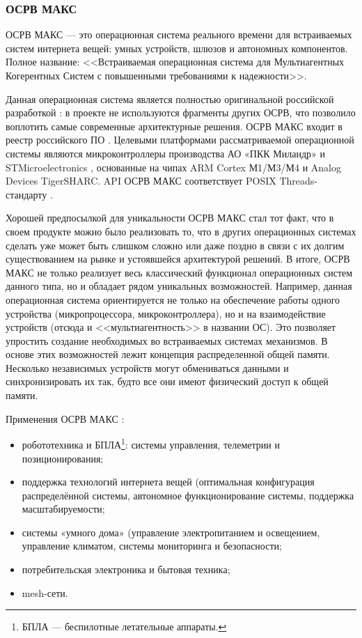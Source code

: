 


\subsubsection{ОСРВ МАКС}

ОСРВ МАКС \cite{MACS_overview} --- это операционная система реального времени для встраиваемых систем интернета вещей: умных устройств, шлюзов и автономных компонентов. Полное название: <<Встраиваемая операционная система для Мультиагентных Когерентных Систем с повышенными требованиями к надежности>>.

Данная операционная система является полностью оригинальной российской разработкой \cite{MACS_Astrosoft}: в проекте не используются фрагменты других ОСРВ, что позволило воплотить самые современные архитектурные решения. ОСРВ МАКС входит в реестр российского ПО \cite{MACS_registry}. Целевыми платформами рассматриваемой операционной системы являются микроконтроллеры производства АО «ПКК Миландр» \cite{Milandr} и STMicroelectronics \cite{STMicroelectronics}, основанные на чипах ARM Cortex М1/М3/М4 и Analog Devices TigerSHARC. API ОСРВ МАКС соответствует POSIX Threads-стандарту \cite{MACS_POSIX}.

Хорошей предпосылкой для уникальности ОСРВ МАКС \cite{MACS_blog} стал тот факт, что в своем продукте можно было реализовать то, что в других операционных системах сделать уже может быть слишком сложно или даже поздно в связи с их долгим существованием на рынке и устоявшейся архитектурой решений. В итоге, ОСРВ МАКС не только реализует весь классический функционал операционных систем данного типа, но и обладает рядом уникальных возможностей. Например, данная операционная система ориентируется не только на обеспечение работы одного устройства (микропроцессора, микроконтроллера), но и на взаимодействие устройств (отсюда и <<мультиагентность>> в названии ОС).  Это позволяет упростить создание необходимых во встраиваемых системах механизмов. В основе этих возможностей лежит концепция распределенной общей памяти. Несколько независимых устройств могут обмениваться данными и синхронизировать их так, будто все они имеют физический доступ к общей памяти.

Применения ОСРВ МАКС \cite{MACS_Astrosoft}: 

\begin{itemize}[label*=---]
	\item робототехника и БПЛА\footnote{БПЛА --- беспилотные летательные аппараты.}: системы управления, телеметрии и позиционирования;
	\item поддержка технологий интернета вещей (оптимальная конфигурация распределённой системы, автономное функционирование системы, поддержка масштабируемости;
	\item системы «умного дома» (управление электропитанием и освещением, управление климатом, системы мониторинга и безопасности;
	\item потребительская электроника и бытовая техника;
	\item mesh-сети.
\end{itemize}



